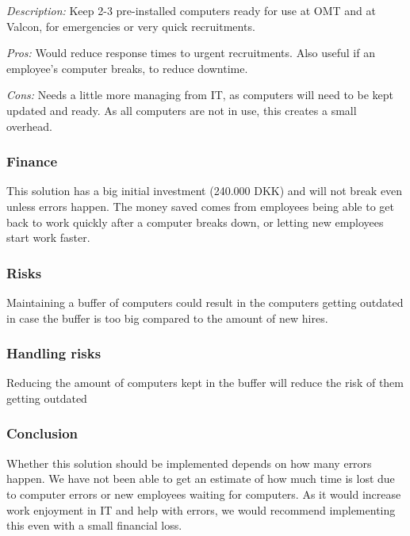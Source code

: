 \emph{Description:} Keep 2-3 pre-installed computers ready for use at OMT and at Valcon, for emergencies or very quick recruitments.

\emph{Pros:} Would reduce response times to urgent recruitments.
Also useful if an employee's computer breaks, to reduce downtime.

\emph{Cons:} Needs a little more managing from IT, as
computers will need to be kept updated and ready.
As all computers are not in use, this creates a small overhead.

\subsubsection{Finance} 
This solution has a big initial investment (240.000 DKK) and will not break even unless errors happen.
The money saved comes from employees being able to get back to work quickly after a computer breaks down, or letting new employees start work faster.

\subsubsection{Risks}
Maintaining a buffer of computers could result in the computers getting outdated in case the buffer is too big compared to the amount of new hires.

\subsubsection{Handling risks}
Reducing the amount of computers kept in the buffer will reduce the risk of them getting outdated

\subsubsection{Conclusion}
Whether this solution should be implemented depends on how many errors happen.
We have not been able to get an estimate of how much time is lost due to computer errors or new employees waiting for computers.
As it would increase work enjoyment in IT and help with errors, we would recommend implementing this even with a small financial loss.